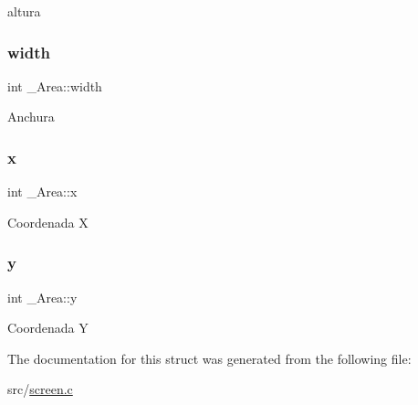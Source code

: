 altura \mbox{\label{struct__Area_aa2f753fc3d254821603ac4512db814f1}} 
\subsubsection{\texorpdfstring{width}{width}}
{\footnotesize\ttfamily int \+\_\+\+Area\+::width}

Anchura \mbox{\label{struct__Area_a093b8c2929094bac88bbf5ee7db85573}} 
\subsubsection{\texorpdfstring{x}{x}}
{\footnotesize\ttfamily int \+\_\+\+Area\+::x}

Coordenada X \mbox{\label{struct__Area_a867e601f05480db03237c3a17d4c77f8}} 
\subsubsection{\texorpdfstring{y}{y}}
{\footnotesize\ttfamily int \+\_\+\+Area\+::y}

Coordenada Y 

The documentation for this struct was generated from the following file\+:\begin{DoxyCompactItemize}
\item 
src/\hyperlink{screen_8c}{screen.\+c}\end{DoxyCompactItemize}
